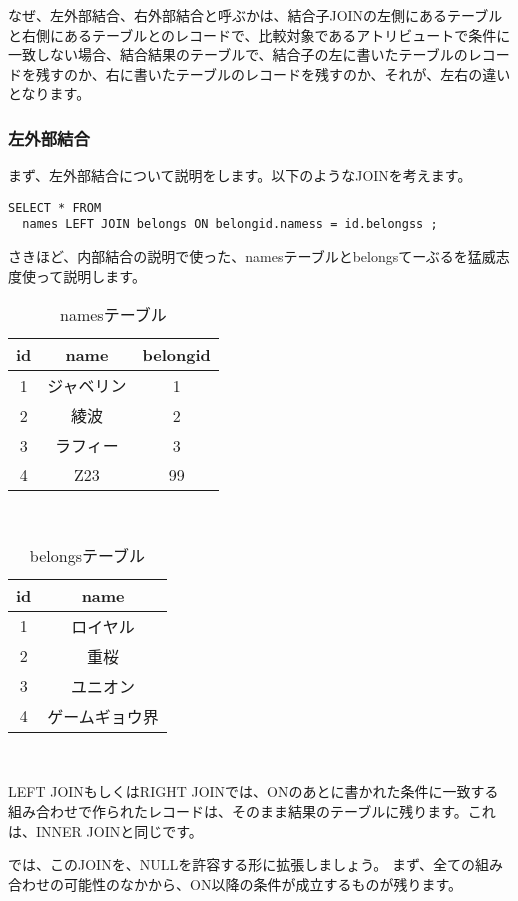 なぜ、左外部結合、右外部結合と呼ぶかは、結合子JOINの左側にあるテーブルと右側にあるテーブルとのレコードで、比較対象であるアトリビュートで条件に一致しない場合、結合結果のテーブルで、結合子の左に書いたテーブルのレコードを残すのか、右に書いたテーブルのレコードを残すのか、それが、左右の違いとなります。

\subsubsection{左外部結合}

まず、左外部結合について説明をします。以下のようなJOINを考えます。

\begin{verbatim}
SELECT * FROM
  names LEFT JOIN belongs ON belongid.namess = id.belongss ;
\end{verbatim}

さきほど、内部結合の説明で使った、namesテーブルとbelongsてーぶるを猛威志度使って説明します。

\begin{table}[htb]
  \begin{tabular}{|c|c|c|} \hline
    id & name & belongid \\ \hline
    1 & ジャベリン & 1 \\
    2 & 綾波 & 2 \\
    3 & ラフィー & 3 \\
    4 & Z23 & 99 \\ \hline
  \end{tabular}
　　\label{table:names_left}
　　\caption{namesテーブル}
\end{table}

\begin{table}[htb]
  \begin{tabular}{|c|c|} \hline
    id & name \\ \hline
    1 & ロイヤル \\
    2 & 重桜 \\
    3 & ユニオン \\ 
    4 & ゲームギョウ界 \\ \hline
  \end{tabular}
　　\label{table:belongs_left}
　　\caption{belongsテーブル}
\end{table}


LEFT JOINもしくはRIGHT JOINでは、ONのあとに書かれた条件に一致する組み合わせで作られたレコードは、そのまま結果のテーブルに残ります。これは、INNER JOINと同じです。

では、このJOINを、NULLを許容する形に拡張しましょう。
まず、全ての組み合わせの可能性のなかから、ON以降の条件が成立するものが残ります。

